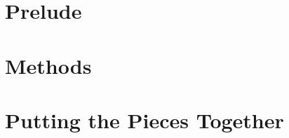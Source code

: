 \documentclass[12pt,chapterprefix=true,listof=totoc]{scrbook}
\begin{document}
\cleardoubleoddpage
\setcounter{tocdepth}{1}
\tableofcontents
\cleardoubleoddpage
{}

\part{Prelude}






%

%

\part{Methods}












%

%



















%

\part{Putting the Pieces Together}
\end{document}
